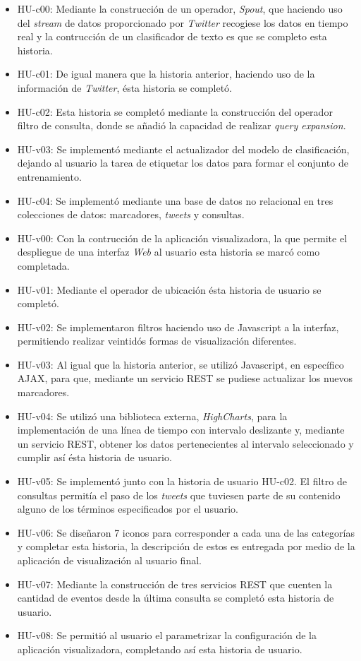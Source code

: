 \begin{itemize}
\item HU-c00: Mediante la construcción de un operador, \textit{Spout}, que haciendo uso del \textit{stream} de datos proporcionado por \textit{Twitter} recogiese los datos en tiempo real y la contrucción de un clasificador de texto es que se completo esta historia.
\item HU-c01: De igual manera que la historia anterior, haciendo uso de la información de \textit{Twitter}, ésta historia se completó.
\item HU-c02: Esta historia se completó mediante la construcción del operador filtro de consulta, donde se añadió la capacidad de realizar \textit{query expansion}.
\item HU-v03: Se implementó mediante el actualizador del modelo de clasificación, dejando al usuario la tarea de etiquetar los datos para formar el conjunto de entrenamiento.
\item HU-c04: Se implementó mediante una base de datos no relacional en tres colecciones de datos: marcadores, \textit{tweets} y consultas.
\item HU-v00: Con la contrucción de la aplicación visualizadora, la que permite el despliegue de una interfaz \textit{Web} al usuario esta historia se marcó como completada.
\item HU-v01: Mediante el operador de ubicación ésta historia de usuario se completó.
\item HU-v02: Se implementaron filtros haciendo uso de Javascript a la interfaz, permitiendo realizar veintidós formas de visualización diferentes.
\item HU-v03: Al igual que la historia anterior, se utilizó Javascript, en específico AJAX, para que, mediante un servicio REST se pudiese actualizar los nuevos marcadores.
\item HU-v04: Se utilizó una biblioteca externa, \textit{HighCharts}, para la implementación de una línea de tiempo con intervalo deslizante y, mediante un servicio REST, obtener los datos pertenecientes al intervalo seleccionado y cumplir así ésta historia de usuario.
\item HU-v05: Se implementó junto con la historia de usuario HU-c02. El filtro de consultas permitía el paso de los \textit{tweets} que tuviesen parte de su contenido alguno de los términos especificados por el usuario.
\item HU-v06: Se diseñaron 7 iconos para corresponder a cada una de las categorías y completar esta historia, la descripción de estos es entregada por medio de la aplicación de visualización al usuario final.
\item HU-v07: Mediante la construcción de tres servicios REST que cuenten la cantidad de eventos desde la última consulta se completó esta historia de usuario.
\item HU-v08: Se permitió al usuario el parametrizar la configuración de la aplicación visualizadora, completando así esta historia de usuario.
\end{itemize}


